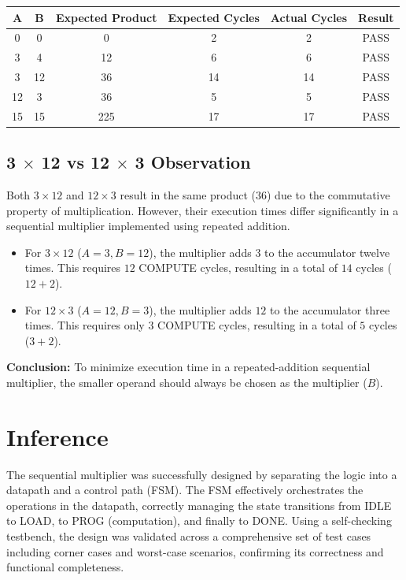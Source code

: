 \documentclass[12pt,a4paper]{article}
\begin{document}
\begin{table}[H]
\centering
\begin{tabular}{|c|c|c|c|c|c|}
\hline
\textbf{A} & \textbf{B} & \textbf{Expected Product} & \textbf{Expected Cycles} & \textbf{Actual Cycles} & \textbf{Result} \\ \hline
0 & 0 & 0 & 2 & 2 & PASS \\ \hline
3 & 4 & 12 & 6 & 6 & PASS \\ \hline
3 & 12 & 36 & 14 & 14 & PASS \\ \hline
12 & 3 & 36 & 5 & 5 & PASS \\ \hline
15 & 15 & 225 & 17 & 17 & PASS \\ \hline
\end{tabular}
\end{table}

\subsection{3 $\times$ 12 vs 12 $\times$ 3 Observation}
Both $3 \times 12$ and $12 \times 3$ result in the same product ($36$) due to the commutative property of multiplication. However, their execution times differ significantly in a sequential multiplier implemented using repeated addition.
\begin{itemize}
    \item For $3 \times 12$ ($A=3, B=12$), the multiplier adds $3$ to the accumulator twelve times. This requires $12$ COMPUTE cycles, resulting in a total of $14$ cycles ($12+2$).
    \item For $12 \times 3$ ($A=12, B=3$), the multiplier adds $12$ to the accumulator three times. This requires only $3$ COMPUTE cycles, resulting in a total of $5$ cycles ($3+2$).
\end{itemize}
\textbf{Conclusion:} To minimize execution time in a repeated-addition sequential multiplier, the smaller operand should always be chosen as the multiplier ($B$).

\section*{Inference}
The sequential multiplier was successfully designed by separating the logic into a datapath and a control path (FSM). The FSM effectively orchestrates the operations in the datapath, correctly managing the state transitions from IDLE to LOAD, to PROG (computation), and finally to DONE. Using a self-checking testbench, the design was validated across a comprehensive set of test cases including corner cases and worst-case scenarios, confirming its correctness and functional completeness.
\end{document}
